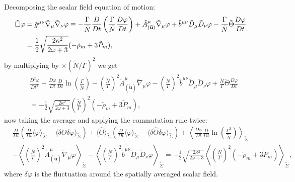 Decomposing the scalar field equation of motion:
\begin{align}
    \Tilde{\Box}\varphi&=\tilde{g}^{\mu\nu}\tilde{\nabla}_\mu\tilde{\nabla}_\nu\varphi\equiv -\frac{\Gamma}{\tilde{N}}\frac{D}{Dt}\left(\frac{\Gamma}{\tilde{N}}\frac{D\varphi}{Dt}\right)+\tilde{A}^\mu_{(\mathbf{\tilde{u}})} \tilde{\nabla}_\mu\varphi +\tilde{b}^{\mu\nu}\tilde{D}_\mu\tilde{D}_\nu\varphi-\frac{\Gamma}{\tilde{N}}\tilde{\Theta}\frac{D\varphi}{Dt}\\
    &=\frac{1}{2}\sqrt{\frac{2\kappa^2}{2\omega+3}}(-\tilde{\rho}_m+3\tilde{P}_m),
\end{align}
by multiplying by $\times (\tilde{N}/\Gamma)^2$ we get
\begin{align}
    &\frac{D^2\varphi}{Dt^2}+\frac{D\varphi}{Dt}\frac{D}{Dt}\ln\left(\frac{\Gamma}{\tilde{N}}\right)-\left(\frac{\tilde{N}}{\Gamma}\right)^2\tilde{A}^\mu_{(\mathbf{\tilde{u}})} \tilde{\nabla}_\mu\varphi -\left(\frac{\tilde{N}}{\Gamma}\right)^2\tilde{b}^{\mu\nu}\tilde{D}_\mu\tilde{D}_\nu\varphi+\frac{\tilde{N}}{\Gamma}\tilde{\Theta}\frac{D\varphi}{Dt}\\
    &=-\frac{1}{2}\sqrt{\frac{2\kappa^2}{2\omega+3}}\left(\frac{\tilde{N}}{\Gamma}\right)^2(-\tilde{\rho}_m+3\tilde{P}_m),
\end{align}
now taking the average and applying the commutation rule twice:
\begin{align}
    &\frac{D}{Dt}\left(\frac{D}{Dt}\langle\varphi\rangle_{\tilde{\Sigma}}-\langle\delta\hat{\Theta}\delta\varphi\rangle_{\tilde{\Sigma}}\right)+\langle\hat{\Theta}\rangle_{\tilde{\Sigma}} \left(\frac{D}{Dt}\langle\varphi\rangle_{\tilde{\Sigma}}-\langle\delta\hat{\Theta}\delta\varphi\rangle_{\tilde{\Sigma}}\right) +\left\langle\frac{D\varphi}{Dt}\frac{D}{Dt}\ln\left(\frac{\Gamma^2}{\tilde{N}}\right)\right\rangle_{\tilde{\Sigma}}\\
    &-\left\langle\left(\frac{\tilde{N}}{\Gamma}\right)^2\tilde{A}^\mu_{(\mathbf{\tilde{u}})} \tilde{\nabla}_\mu\varphi\right\rangle_{\tilde{\Sigma}} -\left\langle \left(\frac{\tilde{N}}{\Gamma}\right)^2\tilde{b}^{\mu\nu}\tilde{D}_\mu\tilde{D}_\nu \varphi \right\rangle_{\tilde{\Sigma}}=-\frac{1}{2}\sqrt{\frac{2\kappa^2}{2\omega+3}}\left\langle\left(\frac{\tilde{N}}{\Gamma}\right)^2(-\tilde{\rho}_m+3\tilde{P}_m)\right\rangle_{\tilde{\Sigma}},\nonumber
    \label{eqn:scalar_field_motion_general_ef}
\end{align}
where $\delta\varphi$ is the fluctuation around the spatially averaged scalar field.

